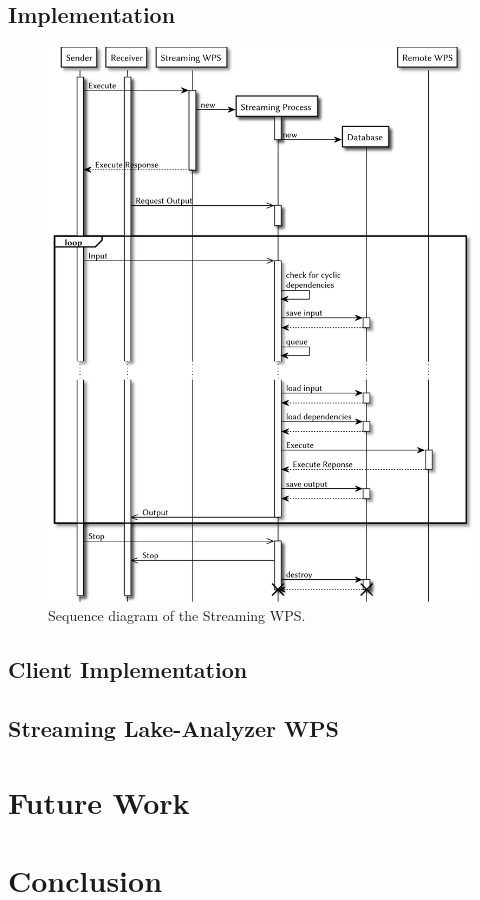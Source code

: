 		\subsection{Implementation}
		\begin{figure}[!htb]
			\centering
			\includegraphics[width=1\textwidth]{figures/sequence-diagramm-swps.pdf}
			\caption{\label{fig:sd:swps} Sequence diagram of the Streaming WPS.}
		\end{figure}
		\subsection{Client Implementation}
		\subsection{Streaming Lake-Analyzer WPS}
	\section{Future Work}
	\section{Conclusion}